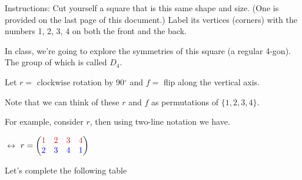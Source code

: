 \documentclass[12pt]{article}
\theoremstyle{definition}
\newcommand{\ds}{\displaystyle}
\begin{document}
\noindent Instructions: Cut yourself a square that is this same shape and size. (One is provided on the last page of this document.)
Label its vertices (corners) with the numbers 1, 2, 3, 4 on both the front and the back.\\
\begin{minipage}{3.5in}
\noindent In class, we're going to explore the symmetries of this square (a regular 4-gon).  The group of which is called $D_4$.


\noindent Let $r=$ clockwise rotation by 90$^\circ$ and $f=$ flip along the vertical axis.

\noindent Note that we can think of these $r$ and $f$ as permutations of $\{1,2,3,4\}$.

\noindent For example, consider $r$, then using two-line notation we have.
\begin{center}
	\begin{minipage}{1.5in}
	\end{minipage}
	\begin{minipage}{1.75in}
		$\leftrightarrow$\quad
		$\ds r= \begin{pmatrix}
		\color{red} 1&\color{red} 2&\color{red} 3&\color{red}4\\
		\color{blue}2&\color{blue} 3&\color{blue} 4&\color{blue} 1
		\end{pmatrix}$
	\end{minipage}
\end{center}
\end{minipage}
\quad\quad
\begin{minipage}{4in}
\end{minipage}
Let's complete the following table
\end{document}
